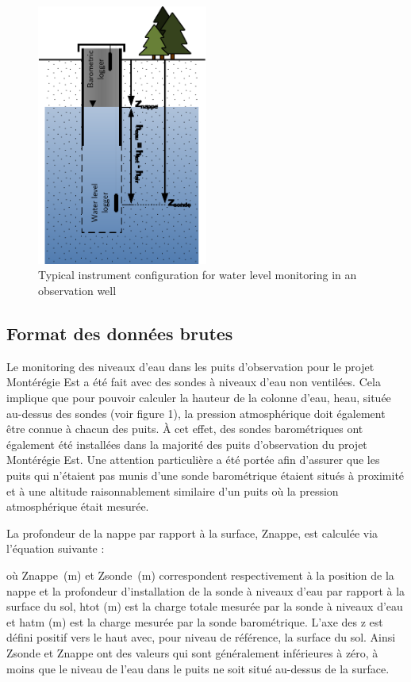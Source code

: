 \documentclass[12pt, letterpaper, fleqn]{report}
\begin{document}
\begin{figure}[h!]
\centering
\includegraphics[width=0.5\textwidth]{ObsWell}
\caption[Typical instrument configuration for water level monitoring in an observation well]{Typical instrument configuration for water level monitoring in an observation well}
\label{fig:obswell_config}
\end{figure}

\subsection{Format des données brutes}

Le monitoring des niveaux d’eau dans les puits d’observation pour le projet Montérégie Est a été fait avec des sondes à niveaux d’eau non ventilées. Cela implique que pour pouvoir calculer la hauteur de la colonne d'eau, heau, située au-dessus des sondes (voir figure 1), la pression atmosphérique doit également être connue à chacun des puits. À cet effet, des sondes barométriques ont également été installées dans la majorité des puits d'observation du projet Montérégie Est. Une attention particulière a été portée afin d'assurer que les puits qui n'étaient pas munis d'une sonde barométrique étaient situés à proximité et à une altitude raisonnablement similaire d'un puits où la pression atmosphérique était mesurée.

La profondeur de la nappe par rapport à la surface, Znappe, est calculée via l'équation suivante : 

où Znappe (m) et Zsonde (m) correspondent respectivement à la position de la nappe et la profondeur d'installation de la sonde à niveaux d'eau par rapport à la surface du sol, htot (m) est la charge totale mesurée par la sonde à niveaux d'eau et hatm (m) est la charge mesurée par la sonde barométrique. L'axe des z est défini positif vers le haut avec, pour niveau de référence, la surface du sol. Ainsi Zsonde et Znappe ont des valeurs qui sont généralement inférieures à zéro, à moins que le niveau de l'eau dans le puits ne soit situé au-dessus de la surface.
\end{document}
